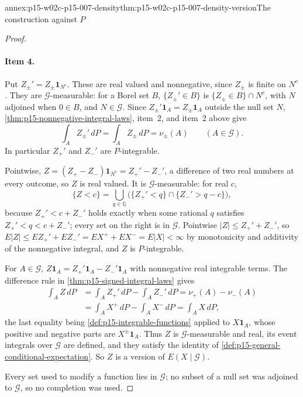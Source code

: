 \begin{annexitem}{annex:p15-w02c-p15-007-density}{thm:p15-w02c-p15-007-density-version}{The construction against \(P\)}
\begin{proof}
\paragraph{Item 4.}
Put \(Z_\pm'=Z_\pm\mathbf1_{N^c}\). These are real valued and nonnegative,
since \(Z_\pm\) is finite on \(N^c\). They are \(\mathcal G\)-measurable:
for a Borel set \(B\), \(\{Z_\pm'\in B\}\) is
\(\{Z_\pm\in B\}\cap N^c\), with \(N\) adjoined when \(0\in B\), and
\(N\in\mathcal G\). Since \(Z_\pm'\mathbf1_A=Z_\pm\mathbf1_A\) outside the
null set \(N\), \cref{thm:p15-nonnegative-integral-laws}, item~2, and
item~2 above give
\[
 \int_AZ_\pm'\,dP=\int_AZ_\pm\,dP=\nu_\pm(A)\qquad(A\in\mathcal G).
\]
In particular \(Z_+'\) and \(Z_-'\) are \(P\)-integrable.

Pointwise, \(Z=(Z_+-Z_-)\mathbf1_{N^c}=Z_+'-Z_-'\), a difference of two
real numbers at every outcome, so \(Z\) is real valued. It is
\(\mathcal G\)-measurable: for real \(c\),
\[
 \{Z<c\}=\bigcup_{q\in\mathbb Q}\bigl(\{Z_+'<q\}\cap\{Z_-'>q-c\}\bigr),
\]
because \(Z_+'<c+Z_-'\) holds exactly when some rational \(q\) satisfies
\(Z_+'<q<c+Z_-'\); every set on the right is in \(\mathcal G\).
Pointwise \(|Z|\leq Z_+'+Z_-'\), so
\(E|Z|\leq EZ_+'+EZ_-'=EX^++EX^-=E|X|<\infty\) by monotonicity and
additivity of the nonnegative integral, and \(Z\) is \(P\)-integrable.

For \(A\in\mathcal G\),
\(Z\mathbf1_A=Z_+'\mathbf1_A-Z_-'\mathbf1_A\) with nonnegative real
integrable terms. The difference rule in
\cref{thm:p15-signed-integral-laws} gives
\[
 \begin{aligned}
 \int_AZ\,dP&=\int_AZ_+'\,dP-\int_AZ_-'\,dP=\nu_+(A)-\nu_-(A)\\
            &=\int_AX^+\,dP-\int_AX^-\,dP=\int_AX\,dP,
 \end{aligned}
\]
the last equality being \cref{def:p15-integrable-functions} applied to
\(X\mathbf1_A\), whose positive and negative parts are
\(X^\pm\mathbf1_A\). Thus \(Z\) is \(\mathcal G\)-measurable and real,
its event integrals over \(\mathcal G\) are defined, and they satisfy the
identity of \cref{def:p15-general-conditional-expectation}. So \(Z\) is a
version of \(E(X\mid\mathcal G)\).

Every set used to modify a function lies in \(\mathcal G\); no subset of a
null set was adjoined to \(\mathcal G\), so no completion was used.
\end{proof}
\end{annexitem}

